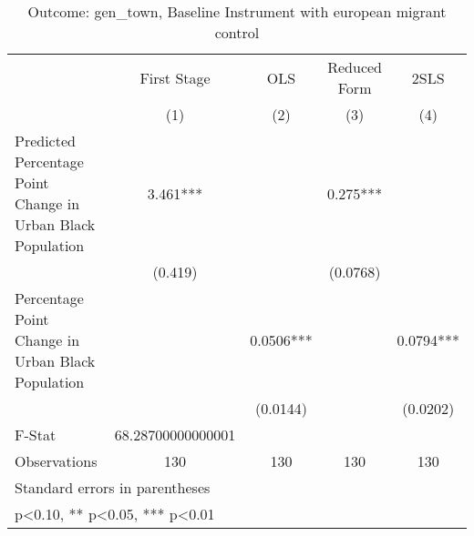 \begin{table}[htbp]\centering
\def\sym#1{\ifmmode^{#1}\else\(^{#1}\)\fi}
\caption{Outcome: gen\_town, Baseline Instrument with european migrant control}
\begin{tabular}{l*{4}{c}}
\toprule
                    & First Stage   &         OLS   &Reduced Form   &        2SLS   \\
                    &\multicolumn{1}{c}{(1)}   &\multicolumn{1}{c}{(2)}   &\multicolumn{1}{c}{(3)}   &\multicolumn{1}{c}{(4)}   \\
\midrule
Predicted Percentage Point Change in Urban Black Population&       3.461***&               &       0.275***&               \\
                    &     (0.419)   &               &    (0.0768)   &               \\
\addlinespace
Percentage Point Change in Urban Black Population&               &      0.0506***&               &      0.0794***\\
                    &               &    (0.0144)   &               &    (0.0202)   \\
\midrule
F-Stat              &68.28700000000001   &               &               &               \\
Observations        &         130   &         130   &         130   &         130   \\
\bottomrule
\multicolumn{5}{l}{\footnotesize Standard errors in parentheses}\\
\multicolumn{5}{l}{\footnotesize * p<0.10, ** p<0.05, *** p<0.01}\\
\end{tabular}
\end{table}
